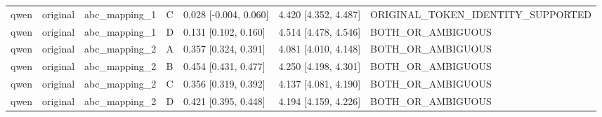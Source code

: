\begin{tabular}{lllllll}
qwen & original & abc\_mapping\_1 & C & 0.028 [-0.004, 0.060] & 4.420 [4.352, 4.487] & ORIGINAL\_TOKEN\_IDENTITY\_SUPPORTED \\
qwen & original & abc\_mapping\_1 & D & 0.131 [0.102, 0.160] & 4.514 [4.478, 4.546] & BOTH\_OR\_AMBIGUOUS \\
qwen & original & abc\_mapping\_2 & A & 0.357 [0.324, 0.391] & 4.081 [4.010, 4.148] & BOTH\_OR\_AMBIGUOUS \\
qwen & original & abc\_mapping\_2 & B & 0.454 [0.431, 0.477] & 4.250 [4.198, 4.301] & BOTH\_OR\_AMBIGUOUS \\
qwen & original & abc\_mapping\_2 & C & 0.356 [0.319, 0.392] & 4.137 [4.081, 4.190] & BOTH\_OR\_AMBIGUOUS \\
qwen & original & abc\_mapping\_2 & D & 0.421 [0.395, 0.448] & 4.194 [4.159, 4.226] & BOTH\_OR\_AMBIGUOUS \\
\bottomrule
\end{tabular}
